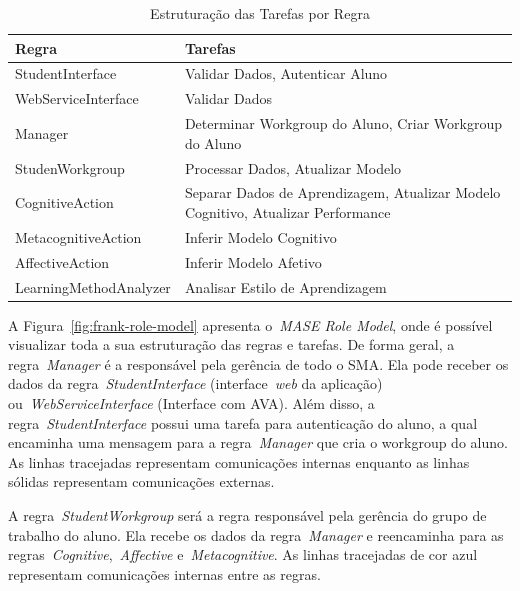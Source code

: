 \begin{table}
	\caption{Estruturação das Tarefas por Regra}
	\begin{tabular}{|p{5cm} | p{9cm}|}
		\hline
		\textbf{Regra}		& \textbf{Tarefas} \\
		\hline
		StudentInterface 	& Validar Dados, Autenticar Aluno  \\
		\hline
		WebServiceInterface 	& Validar Dados  \\
		\hline
		Manager 		& Determinar Workgroup do Aluno, Criar Workgroup do Aluno  \\ %
		\hline
		StudenWorkgroup 	& Processar Dados, Atualizar Modelo   \\
		\hline
		CognitiveAction 	& Separar Dados de Aprendizagem, Atualizar Modelo Cognitivo, Atualizar Performance  \\
		\hline
		MetacognitiveAction 	& Inferir Modelo Cognitivo  \\
		\hline
		AffectiveAction 	& Inferir Modelo Afetivo  \\
		\hline
		LearningMethodAnalyzer 	& Analisar Estilo de Aprendizagem  \\
		\hline
	\end{tabular}
	\label{tabela:mase-role-model}
\end{table}

A Figura~\ref{fig:frank-role-model} apresenta o~\emph{MASE Role Model}, onde é possível visualizar toda a sua estruturação das regras e tarefas. De forma geral, a regra~\emph{Manager} é a responsável pela gerência de todo o SMA. Ela pode receber os dados da regra~\emph{StudentInterface} (interface~\emph{web} da aplicação) ou~\emph{WebServiceInterface} (Interface com AVA). Além disso, a regra~\emph{StudentInterface} possui uma tarefa para autenticação do aluno, a qual encaminha uma mensagem para a regra~\emph{Manager} que cria o workgroup do aluno. As linhas tracejadas representam comunicações internas enquanto as linhas sólidas representam comunicações externas.

A regra~\emph{StudentWorkgroup} será a regra responsável pela gerência do grupo de trabalho do aluno. Ela recebe os dados da regra~\emph{Manager} e reencaminha para as regras~\emph{Cognitive},~\emph{Affective} e~\emph{Metacognitive}. As linhas tracejadas de cor azul representam comunicações internas entre as regras.

